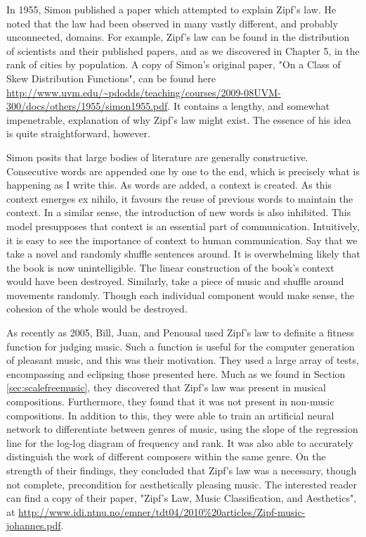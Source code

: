\documentclass[10pt]{book}
\begin{document}
In 1955, Simon published a paper which attempted to explain Zipf's law. He noted that the law had been observed in many vastly different, and probably unconnected, domains. For example, Zipf's law can be found in the distribution of scientists and their published papers, and as we discovered in Chapter 5, in the rank of cities by population. A copy of Simon's original paper, "On a Class of Skew Distribution Functions", can be found here \url{http://www.uvm.edu/~pdodds/teaching/courses/2009-08UVM-300/docs/others/1955/simon1955.pdf}. It contains a lengthy, and somewhat impenetrable, explanation of why Zipf's law might exist. The essence of his idea is quite straightforward, however.

Simon posits that large bodies of literature are generally constructive. Consecutive words are appended one by one to the end, which is precisely what is happening as I write this. As words are added, a context is created. As this context emerges ex nihilo, it favours the reuse of previous words to maintain the context. In a similar sense, the introduction of new words is also inhibited. This model presupposes that context is an essential part of communication. Intuitively, it is easy to see the importance of context to human communication. Say that we take a novel and randomly shuffle sentences around. It is overwhelming likely that the book is now unintelligible. The linear construction of the book's context would have been destroyed. Similarly, take a piece of music and shuffle around movements randomly. Though each individual component would make sense, the cohesion of the whole would be destroyed.

As recently as 2005, Bill, Juan, and Penousal used Zipf's law to definite a fitness function for judging music. Such a function is useful for the computer generation of pleasant music, and this was their motivation. They used a large array of tests, encompassing and eclipsing those presented here. Much as we found in Section \ref{sec:scalefreemusic}, they discovered that Zipf's law was present in musical compositions. Furthermore, they found that it was not present in non-music compositions. In addition to this, they were able to train an artificial neural network to differentiate between genres of music, using the slope of the regression line for the log-log diagram of frequency and rank. It was also able to accurately distinguish the work of different composers within the same genre. On the strength of their findings, they concluded that Zipf's law was a necessary, though not complete, precondition for aesthetically pleasing music. The interested reader can find a copy of their paper, "Zipf's Law, Music Classification, and Aesthetics", at \url{http://www.idi.ntnu.no/emner/tdt04/2010%20articles/Zipf-music-johannes.pdf}.
\end{document}
